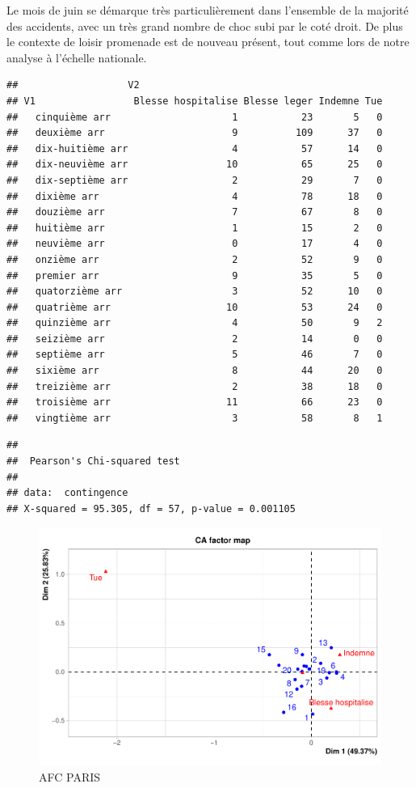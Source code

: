 \documentclass[french,]{compterendu}
\theoremstyle{urcastyle}
\theoremstyle{remark}
\begin{document}
Le mois de juin se démarque très particulièrement dans l'ensemble de la majorité des accidents, avec un très grand nombre de choc subi par le coté droit. De plus le contexte de loisir promenade est de nouveau présent, tout comme lors de notre analyse à l'échelle nationale.

\begin{verbatim}
##                   V2
## V1                 Blesse hospitalise Blesse leger Indemne Tue
##   cinquième arr                     1           23       5   0
##   deuxième arr                      9          109      37   0
##   dix-huitième arr                  4           57      14   0
##   dix-neuvième arr                 10           65      25   0
##   dix-septième arr                  2           29       7   0
##   dixième arr                       4           78      18   0
##   douzième arr                      7           67       8   0
##   huitième arr                      1           15       2   0
##   neuvième arr                      0           17       4   0
##   onzième arr                       2           52       9   0
##   premier arr                       9           35       5   0
##   quatorzième arr                   3           52      10   0
##   quatrième arr                    10           53      24   0
##   quinzième arr                     4           50       9   2
##   seizième arr                      2           14       0   0
##   septième arr                      5           46       7   0
##   sixième arr                       8           44      20   0
##   treizième arr                     2           38      18   0
##   troisième arr                    11           66      23   0
##   vingtième arr                     3           58       8   1
\end{verbatim}

\begin{verbatim}
## 
##  Pearson's Chi-squared test
## 
## data:  contingence
## X-squared = 95.305, df = 57, p-value = 0.001105
\end{verbatim}

\begin{figure}[H]

{\centering \includegraphics[width=0.9\linewidth]{Rapport_ADD_LEO-GABET_files/figure-latex/Afc2PARIS-1} 

}

\caption{AFC PARIS}\label{fig:Afc2PARIS}
\end{figure}
\end{document}
